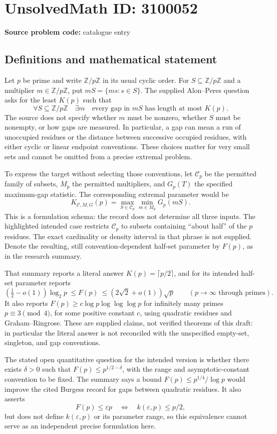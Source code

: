 \documentclass[11pt]{article}
\newcommand{\Z}{\mathbb{Z}}
\begin{document}
\section*{UnsolvedMath ID: 3100052}
\textbf{Source problem code:} catalogue entry
\subsection{Definitions and mathematical statement}
Let $p$ be prime and write $\Z/p\Z$ in its usual cyclic order. For $S\subseteq\Z/p\Z$ and a multiplier $m\in\Z/p\Z$, put $mS=\{ms:s\in S\}$. The supplied Alon--Peres question asks for the least $K(p)$ such that
\[
 \forall S\subseteq\Z/p\Z\quad\exists m\quad
       \text{every gap in }mS\text{ has length at most }K(p).
\]
The source does not specify whether $m$ must be nonzero, whether $S$ must be nonempty, or how gaps are measured. In particular, a gap can mean a run of unoccupied residues or the distance between successive occupied residues, with either cyclic or linear endpoint conventions. These choices matter for very small sets and cannot be omitted from a precise extremal problem.

To express the target without selecting those conventions, let $\mathcal C_p$ be the permitted family of subsets, $M_p$ the permitted multipliers, and $G_p(T)$ the specified maximum-gap statistic. The corresponding extremal parameter would be
\[
 K_{\mathcal C,M,G}(p)=
 \max_{S\in\mathcal C_p}\min_{m\in M_p}G_p(mS).
\]
This is a formulation schema: the record does not determine all three inputs. The highlighted intended case restricts $\mathcal C_p$ to subsets containing ``about half'' of the $p$ residues. The exact cardinality or density interval in that phrase is not supplied. Denote the resulting, still convention-dependent half-set parameter by $F(p)$, as in the research summary.

That summary reports a literal answer $K(p)=\lceil p/2\rceil$, and for its intended half-set parameter reports
\[
 (\tfrac12-o(1))\log_2p\ \le F(p)\ \le
 (2\sqrt2+o(1))\sqrt p\qquad(p\longrightarrow\infty
 \text{ through primes}).
\]
It also reports $F(p)\ge c\log p\log\log\log p$ for infinitely many primes $p\equiv3\pmod4$, for some positive constant $c$, using quadratic residues and Graham--Ringrose. These are supplied claims, not verified theorems of this draft: in particular the literal answer is not reconciled with the unspecified empty-set, singleton, and gap conventions.

The stated open quantitative question for the intended version is whether there exists $\delta>0$ such that $F(p)\le p^{1/2-\delta}$, with the range and asymptotic-constant convention to be fixed. The summary says a bound $F(p)\le p^{1/4}/\log p$ would improve the cited Burgess record for gaps between quadratic residues. It also asserts
\[
 F(p)\le\varepsilon p\quad\Longleftrightarrow\quad
 k(\varepsilon,p)\le p/2,
\]
but does not define $k(\varepsilon,p)$ or its parameter range, so this equivalence cannot serve as an independent precise formulation here.
\end{document}
